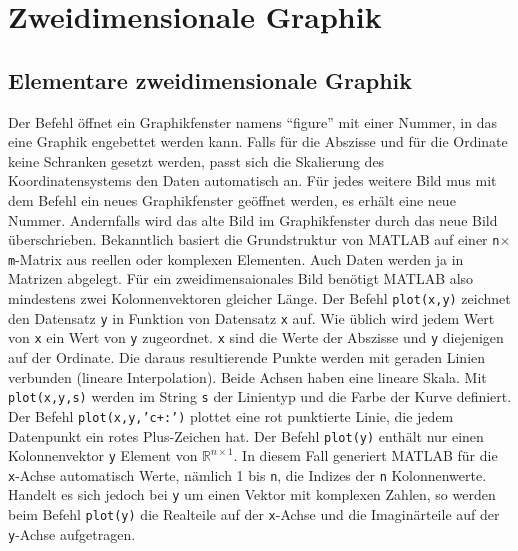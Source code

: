 \section{Zweidimensionale Graphik}
\subsection{Elementare zweidimensionale Graphik}
Der Befehl  öffnet ein Graphikfenster namens ``figure'' mit einer Nummer, in das eine Graphik engebettet werden kann. Falls für die Abszisse und für die Ordinate keine Schranken gesetzt werden, passt sich die Skalierung des Koordinatensystems den Daten automatisch an. Für jedes weitere Bild mus mit dem Befehl  ein neues Graphikfenster geöffnet werden, es erhält eine neue Nummer. Andernfalls wird das alte Bild im Graphikfenster durch das neue Bild überschrieben.
\newline\newline
Bekanntlich basiert die Grundstruktur von MATLAB auf einer \texttt{n$\times$m}-Matrix aus reellen oder komplexen Elementen. Auch Daten werden ja in Matrizen abgelegt. Für ein zweidimensaionales Bild benötigt MATLAB also mindestens zwei Kolonnenvektoren gleicher Länge.
\newline\newline
Der Befehl {\color{red}\texttt{plot(x,y)}} zeichnet den Datensatz \texttt{y} in Funktion von Datensatz \texttt{x} auf. Wie üblich wird jedem Wert von \texttt{x} ein Wert von \texttt{y} zugeordnet. \texttt{x} sind die Werte der Abszisse und \texttt{y} diejenigen auf der Ordinate. Die daraus resultierende Punkte werden mit geraden Linien verbunden (lineare Interpolation). Beide Achsen haben eine lineare Skala.
\newline\newline
Mit {\color{red}\texttt{plot(x,y,s)}} werden im String \texttt{s} der Linientyp und die Farbe der Kurve definiert. Der Befehl {\color{red}\texttt{plot(x,y,'c+:')}} plottet eine rot punktierte Linie, die jedem Datenpunkt ein rotes Plus-Zeichen hat. Der Befehl {\color{red}\texttt{plot(y)}} enthält nur einen Kolonnenvektor \texttt{y} Element von \texttt{$\mathbb{R}^{n\times 1}$}. In diesem Fall generiert MATLAB für die \texttt{x}-Achse automatisch Werte, nämlich 1 bis \texttt{n}, die Indizes der \texttt{n} Kolonnenwerte.
\newline\newline
Handelt es sich jedoch bei \texttt{y} um einen Vektor mit komplexen Zahlen, so werden beim Befehl {\color{red}\texttt{plot(y)}} die Realteile auf der \texttt{x}-Achse und die Imaginärteile auf der \texttt{y}-Achse aufgetragen.
